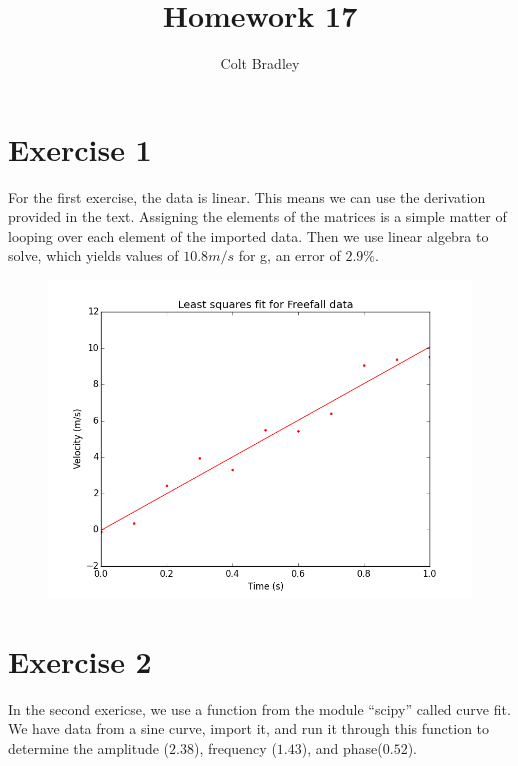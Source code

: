 \documentclass[11pt]{article}
\begin{document}
\title{Homework 17}
\author{Colt Bradley}
\date{}
\maketitle
\section{Exercise 1}

For the first exercise, the data is linear. This means we can use the derivation provided in the text. Assigning the elements of the matrices is a simple matter of looping over each element of the imported data. Then we use linear algebra to solve, which yields values of $10.8 m/s$ for g, an error of $2.9\%$.

\begin{figure}[ht]
\centering
\includegraphics[scale=.5]{freefall.png}
\end{figure}

\section{Exercise 2}

In the second exericse, we use a function from the module ``scipy'' called curve fit. We have data from a sine curve, import it, and run it through this function to determine the amplitude ($2.38$), frequency ($1.43$), and phase($0.52$). 
\end{document}
